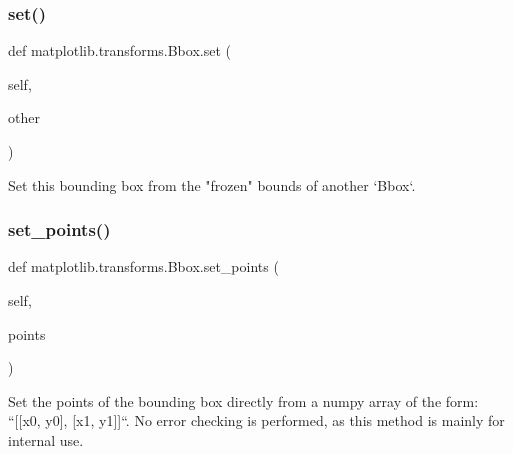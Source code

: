 \mbox{\label{classmatplotlib_1_1transforms_1_1Bbox_a2f883a7bdc92d132916ec53173afd5b7}} 
\subsubsection{\texorpdfstring{set()}{set()}}
{\footnotesize\ttfamily def matplotlib.\+transforms.\+Bbox.\+set (\begin{DoxyParamCaption}\item[{}]{self,  }\item[{}]{other }\end{DoxyParamCaption})}

\begin{DoxyVerb}Set this bounding box from the "frozen" bounds of another `Bbox`.
\end{DoxyVerb}
 \mbox{\label{classmatplotlib_1_1transforms_1_1Bbox_a70c4249e996012c64a6d5b8c59dc9885}} 
\subsubsection{\texorpdfstring{set\+\_\+points()}{set\_points()}}
{\footnotesize\ttfamily def matplotlib.\+transforms.\+Bbox.\+set\+\_\+points (\begin{DoxyParamCaption}\item[{}]{self,  }\item[{}]{points }\end{DoxyParamCaption})}

\begin{DoxyVerb}Set the points of the bounding box directly from a numpy array
of the form: ``[[x0, y0], [x1, y1]]``.  No error checking is
performed, as this method is mainly for internal use.
\end{DoxyVerb}
 \mbox{\label{classmatplotlib_1_1transforms_1_1Bbox_a8e4cdb81d1b8f23d1a69bb3636e1269b}} 
